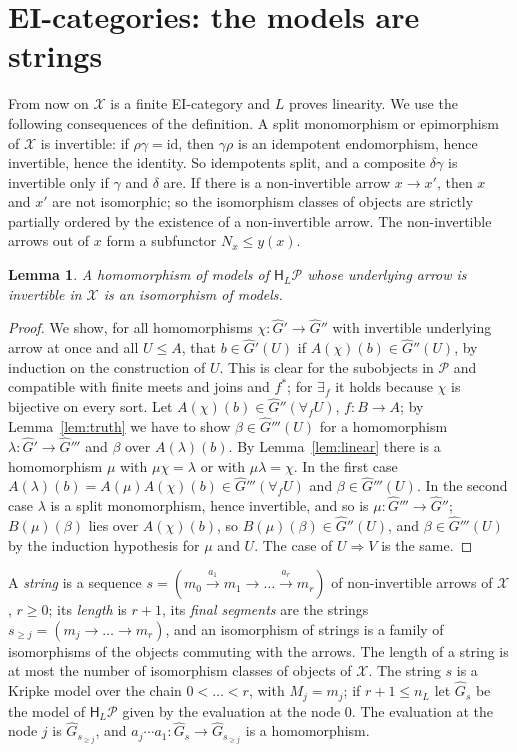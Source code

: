 \documentclass[11pt]{amsart}
\newtheorem{lem}[thm]{Lemma}
\theoremstyle{definition}
\newcommand{\HH}{\mathsf H}
\newcommand{\cX}{\mathcal X}
\newcommand{\cP}{\mathcal P}
\newcommand{\id}{\mathrm{id}}
\begin{document}
\section{EI-categories: the models are strings}\label{sec:strings}

From now on $\cX$ is a finite EI-category and $L$ proves linearity. We
use the following consequences of the definition. A split monomorphism
or epimorphism of $\cX$ is invertible: if $\rho\gamma=\id$, then
$\gamma\rho$ is an idempotent endomorphism, hence invertible, hence the
identity. So idempotents split, and a composite $\delta\gamma$ is
invertible only if $\gamma$ and $\delta$ are. If there is a
non-invertible arrow $x\to x'$, then $x$ and $x'$ are not isomorphic;
so the isomorphism classes of objects are strictly partially ordered
by the existence of a non-invertible arrow. The non-invertible arrows
out of $x$ form a subfunctor $N_x\le y(x)$.

\begin{lem}\label{lem:iso}
A homomorphism of models of $\HH_L\cP$ whose underlying arrow is
invertible in $\cX$ is an isomorphism of models.
\end{lem}
\begin{proof}
We show, for all homomorphisms $\chi\colon\hat G'\to\hat G''$ with
invertible underlying arrow at once and all $U\le A$, that $b\in\hat
G'(U)$ if $A(\chi)(b)\in\hat G''(U)$, by induction on the construction
of $U$. This is clear for the subobjects in $\cP$ and compatible with
finite meets and joins and $f^*$; for $\exists_f$ it holds because
$\chi$ is bijective on every sort. Let $A(\chi)(b)\in\hat
G''(\forall_fU)$, $f\colon B\to A$; by Lemma~\ref{lem:truth} we have to
show $\beta\in\hat G'''(U)$ for a homomorphism $\lambda\colon\hat G'\to
\hat G'''$ and $\beta$ over $A(\lambda)(b)$. By Lemma~\ref{lem:linear}
there is a homomorphism $\mu$ with $\mu\chi=\lambda$ or with
$\mu\lambda=\chi$. In the first case $A(\lambda)(b)=A(\mu)A(\chi)(b)
\in\hat G'''(\forall_fU)$ and $\beta\in\hat G'''(U)$. In the second
case $\lambda$ is a split monomorphism, hence invertible, and so is
$\mu\colon\hat G'''\to\hat G''$; $B(\mu)(\beta)$ lies over
$A(\chi)(b)$, so $B(\mu)(\beta)\in\hat G''(U)$, and $\beta\in\hat
G'''(U)$ by the induction hypothesis for $\mu$ and $U$. The case of
$U\Rightarrow V$ is the same.
\end{proof}

A \emph{string} is a sequence $s=(m_0\xrightarrow{a_1}m_1\to\dots
\xrightarrow{a_r}m_r)$ of non-invertible arrows of $\cX$, $r\ge0$; its
\emph{length} is $r+1$, its \emph{final segments} are the strings
$s_{\ge j}=(m_j\to\dots\to m_r)$, and an isomorphism of strings is a
family of isomorphisms of the objects commuting with the arrows. The
length of a string is at most the number of isomorphism classes of
objects of $\cX$. The string $s$ is a Kripke model over the chain
$0<\dots<r$, with $M_j=m_j$; if $r+1\le n_L$ let $\hat G_s$ be the
model of $\HH_L\cP$ given by the evaluation at the node $0$. The
evaluation at the node $j$ is $\hat G_{s_{\ge j}}$, and
$a_j\cdots a_1\colon\hat G_s\to\hat G_{s_{\ge j}}$ is a homomorphism.
\end{document}
